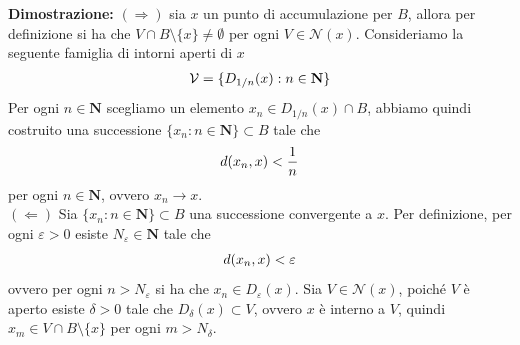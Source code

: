 \documentclass{article}
\begin{document}
\textbf{Dimostrazione:} $(\Rightarrow)$ sia $x$ un punto di accumulazione per $B$, allora per definizione si ha che $V \cap B \setminus \{x\} \neq \emptyset$ per ogni $V \in \mathcal{N}(x)$. Consideriamo la seguente famiglia di intorni aperti di $x$
\begin{align}
    \mathcal{V} = \{D_{1/n}(x) : n \in \mathbf{N}\} \notag
\end{align}
Per ogni $n \in \mathbf{N}$ scegliamo un elemento $x_n \in D_{1/n}(x) \cap B$, abbiamo quindi costruito una successione $\{x_n : n \in \mathbf{N}\} \subset B$ tale che
\begin{align}
    d(x_n, x) < \frac{1}{n} \notag
\end{align}
per ogni $n \in \mathbf{N}$, ovvero $x_n \rightarrow x$. \\
$(\Leftarrow)$ Sia $\{x_n : n \in \mathbf{N}\} \subset B$ una successione convergente a $x$. Per definizione, per ogni $\varepsilon > 0$ esiste $N_\varepsilon \in \mathbf{N}$ tale che
\begin{align}
    d(x_n, x) < \varepsilon \notag
\end{align}
ovvero per ogni $n > N_\varepsilon$ si ha che $x_n \in D_{\varepsilon}(x)$. Sia $V \in \mathcal{N}(x)$, poiché $V$ è aperto esiste $\delta > 0$ tale che $D_\delta(x) \subset V$, ovvero $x$ è interno a $V$, quindi $x_m \in V \cap B \setminus \{x\}$ per ogni $m > N_\delta$.

\newpage
\end{document}
